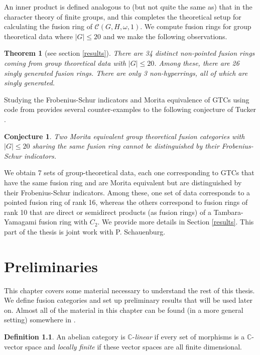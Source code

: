 \documentclass[a4paper, 10pt]{book}
\newtheorem{Thm}{Theorem}[chapter]
\newtheorem{Conj}[theorem]{Conjecture}
\theoremstyle{definition}
\newtheorem{Def}[theorem]{Definition}
\numberwithin{equation}{chapter}
\newcommand\kk{\mathbb C}
\newcommand\C{\mathcal C}
\begin{document}
An inner product is defined analogous to  (but not quite the same as) that in the character theory of finite groups, and this completes the theoretical setup for calculating the fusion ring of $\C(G, H, \omega, 1)$. We compute fusion rings for group theoretical data where $|G|\leq 20$ and we make the following observations.  
\begin{Thm} [see section \ref{results}]
There are 34 distinct non-pointed fusion rings coming from group theoretical data with $|G|\leq 20$. Among these, there are 26 singly generated fusion rings. There are only 3 non-hyperrings, all of which are singly generated.
\end{Thm}

Studying the Frobenius-Schur indicators and Morita equivalence of GTCs using code from \cite{2017arXiv170806538M} provides several counter-examples to the following conjecture of Tucker \cite[Conjecture 5.6]{MR4044867}.
\begin{Conj}
Two Morita equivalent group theoretical fusion categories with $|G|\leq 20$ sharing the same fusion ring cannot be distinguished by their Frobenius-Schur indicators.
\end{Conj}
We obtain 7 sets of group-theoretical data, each one corresponding to GTCs that have the same fusion ring and are Morita equivalent but are distinguished by their Frobenius-Schur indicators. Among these, one set of data corresponds to a pointed fusion ring of rank 16, whereas the others correspond to fusion rings of rank 10 that are direct or semidirect products (as fusion rings) of a Tambara-Yamagami fusion ring with $C_2$. We provide more details in Section \ref{results}. This part of the thesis is joint work with P. Schauenburg.



\chapter{Preliminaries}\label{prelims}


This chapter covers some material necessary to understand the rest of this thesis. We define fusion categories and set up preliminary results that will be used later on. Almost all of the material in this chapter can be found (in a more general setting) somewhere in \cite{EGNO}.
\begin{Def}
An abelian category  is $\kk$-\textit{linear} if every set of morphisms is a  $\kk$-vector space and \textit{locally finite} if these vector spaces are all finite dimensional.
\end{Def}
\end{document}
